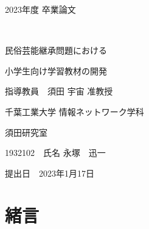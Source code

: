 \documentclass[12pt]{ltjsarticle}
\begin{document}
\begin{titlepage}
  \begin{center}
  
    \vspace*{20truept}
    
    {\LARGE 2023年度 卒業論文} 
    
    \vspace*{75truept}
    
    {\Huge }　%

    \vspace{10truept}

    {\Huge 民俗芸能継承問題における}　%

    \vspace{10truept}

    {\Huge 小学生向け学習教材の開発}　%

    \vspace{85truept}
    
    {\LARGE 指導教員　須田 宇宙 准教授}
    
    \vspace{60truept}
    
    {\LARGE 千葉工業大学 情報ネットワーク学科}
    
    \vspace{15truept}
    
    {\LARGE 須田研究室}
    
    \vspace{70truept}
    
    {\LARGE 1932102　氏名 永塚　迅一 }　%

    \vspace{70truept}
    
  \end{center}
  \begin{flushright}

    {\LARGE 提出日　2023年1月17日}
  
  \end{flushright}
\end{titlepage}

\newpage
\setcounter{tocdepth}{3}
\pagestyle{plain}



\tableofcontents
\listoffigures
\newpage
{}
\section{緒言}
\end{document}
